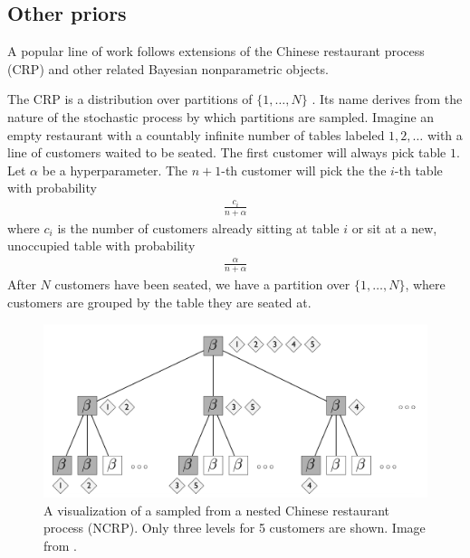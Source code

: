 \documentclass{article}
\begin{document}
\subsection{Other priors}

A popular line of work
follows extensions of the Chinese restaurant
process (CRP) and other related Bayesian nonparametric objects.

The CRP is a distribution
over partitions of $\{1, \ldots, N\}$ \citep{Aldous1985}.
Its name derives
from the nature of the stochastic process
by which partitions are sampled.
Imagine an empty restaurant with
a countably infinite number of tables
labeled $1, 2, \ldots$
with a line of customers waited to be seated.
The first customer will always pick 
table $1$.
Let $\alpha$ be a hyperparameter.
The $n + 1$-th customer will pick the
the $i$-th table with probability
\begin{align}
    \frac{c_i}{n + \alpha}
\end{align}
where $c_i$ is the number
of customers already sitting at
table $i$ or
sit at a new, unoccupied table with probability
\begin{align}
    \frac{\alpha}{n + \alpha}
\end{align}
After $N$ customers have been seated,
we have a partition over $\{1,\ldots, N\}$,
where customers are grouped
by the table they are seated at.

\begin{figure}[t]
  \includegraphics[width=\textwidth]{img/ncrp}
  \caption{A visualization of a sampled from
  a nested Chinese
  restaurant process (NCRP). Only three levels
  for 5 customers are shown.
  Image from \citep{Blei2010}.}
\label{fig:ncrp}
\end{figure}
\end{document}
